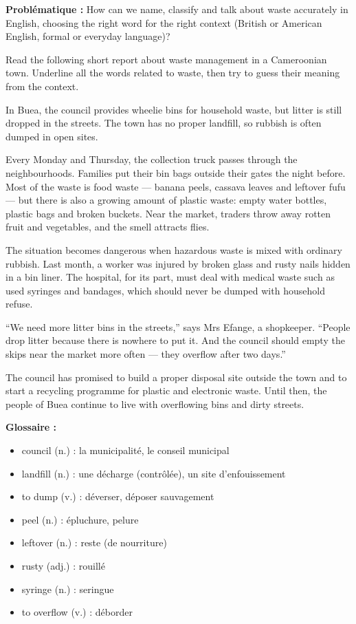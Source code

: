 \documentclass[11pt]{article}
\newcommand{\cle}[1]{{\popxbold\color{popdark}#1}}
\newcounter{popsec}
\newcounter{popsub}
\newcommand{\courssub}[1]{%
  \stepcounter{popsub}%
  \par\vspace{9pt}\noindent{\popxbold\fontsize{11.5}{13}\selectfont\color{popink}{\color{poporange}\thepopsec.\thepopsub}\hspace{6pt}#1}\par\nopagebreak\vspace{4pt}
}
\begin{document}
\textbf{Problématique :} How can we name, classify and talk about waste accurately in English, choosing the right word for the right context (British or American English, formal or everyday language)?

\courssub{Discovering the vocabulary through a text}

Read the following short report about waste management in a Cameroonian town. Underline all the words related to waste, then try to guess their meaning from the context.

\begin{textebox}
In Buea, the council provides wheelie bins for household waste, but litter is still dropped in the streets. The town has no proper landfill, so rubbish is often dumped in open sites.

Every Monday and Thursday, the collection truck passes through the neighbourhoods. Families put their bin bags outside their gates the night before. Most of the waste is food waste — banana peels, cassava leaves and leftover fufu — but there is also a growing amount of plastic waste: empty water bottles, plastic bags and broken buckets. Near the market, traders throw away rotten fruit and vegetables, and the smell attracts flies.

The situation becomes dangerous when hazardous waste is mixed with ordinary rubbish. Last month, a worker was injured by broken glass and rusty nails hidden in a bin liner. The hospital, for its part, must deal with medical waste such as used syringes and bandages, which should never be dumped with household refuse.

“We need more litter bins in the streets,” says Mrs Efange, a shopkeeper. “People drop litter because there is nowhere to put it. And the council should empty the skips near the market more often — they overflow after two days.”

The council has promised to build a proper disposal site outside the town and to start a recycling programme for plastic and electronic waste. Until then, the people of Buea continue to live with overflowing bins and dirty streets.
\end{textebox}

\textbf{Glossaire :}
\begin{itemize}
\item \cle{council} (n.) : la municipalité, le conseil municipal
\item \cle{landfill} (n.) : une décharge (contrôlée), un site d'enfouissement
\item \cle{to dump} (v.) : déverser, déposer sauvagement
\item \cle{peel} (n.) : épluchure, pelure
\item \cle{leftover} (n.) : reste (de nourriture)
\item \cle{rusty} (adj.) : rouillé
\item \cle{syringe} (n.) : seringue
\item \cle{to overflow} (v.) : déborder
\end{itemize}
\end{document}
